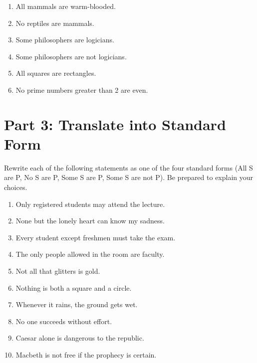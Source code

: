 \documentclass[12pt]{article}
\begin{document}
\begin{enumerate}[leftmargin=*]
\item All mammals are warm-blooded.

\item No reptiles are mammals.

\item Some philosophers are logicians.

\item Some philosophers are not logicians.

\item All squares are rectangles.

\item No prime numbers greater than 2 are even.
\end{enumerate}

\section*{Part 3: Translate into Standard Form}
Rewrite each of the following statements as one of the four standard forms (All S are P, No S are P, Some S are P, Some S are not P). Be prepared to explain your choices.

\begin{enumerate}[leftmargin=*]
\item Only registered students may attend the lecture.

\item None but the lonely heart can know my sadness.

\item Every student except freshmen must take the exam.

\item The only people allowed in the room are faculty.

\item Not all that glitters is gold.

\item Nothing is both a square and a circle.

\item Whenever it rains, the ground gets wet.

\item No one succeeds without effort.
\item Caesar alone is dangerous to the republic.
\item Macbeth is not free if the prophecy is certain.
\end{enumerate}
\end{document}
